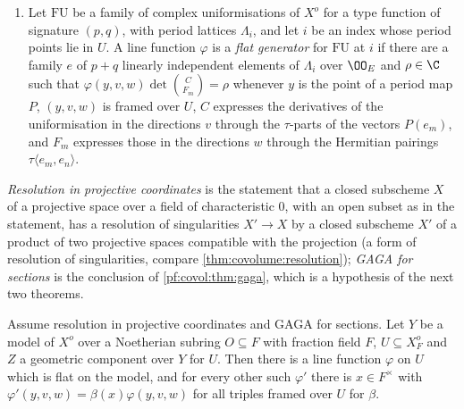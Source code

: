 \begin{definition}
\begin{enumerate}[label=(\alph*)]
{  $\kappa$} if $\log\|j(\varphi(y,v,w))\|=t$ for every discrete valuation ring $V'$ with fraction field $K'$,
  every embedding $j\colon K'\to\C_\ell$ with $V'=\{\|j(\cdot)\|\le1\}$ and $j\beta=\kappa$, and every triple
  framed over $U$ for $\beta$ at a point $y$ which extends to a semi-abelian scheme over $V'$ such that $v,w$
  are integral eigenframes of it.
\item Let $\mathrm{FU}$ be a family of complex uniformisations of $X^o$ for a type function of signature
  $(p,q)$, with period lattices $\Lambda_i$, and let $i$ be an index whose period points lie in $U$. A line
  function $\varphi$ is a \emph{flat generator} for $\mathrm{FU}$ at $i$ if there are a family $e$ of $p+q$
  linearly independent elements of $\Lambda_i$ over $\OO_E$ and $\rho\in\C$ such that
  $\varphi(y,v,w)\det\binom{C}{F_m}=\rho$ whenever $y$ is the point of a period map $P$, $(y,v,w)$ is framed
  over $U$, $C$ expresses the derivatives of the uniformisation in the directions $v$ through the
  $\tau$-parts of the vectors $P(e_m)$, and $F_m$ expresses those in the directions $w$ through the Hermitian
  pairings $\tau\langle e_m,e_n\rangle$.
\end{enumerate}
%
%
%
\end{definition}

\emph{Resolution in projective coordinates} is the statement that a closed subscheme $X$ of a projective space
over a field of characteristic $0$, with an open subset as in the statement, has a resolution of
singularities $X'\to X$ by a closed subscheme $X'$ of a product of two projective spaces compatible with the
projection (a form of resolution of singularities, compare \cref{thm:covolume:resolution});
\emph{GAGA for sections} is the conclusion of \cref{pf:covol:thm:gaga}, which is a hypothesis of the next
two theorems.

\begin{theorem}\label{pf:covol:thm:flatzero}
Assume resolution in projective coordinates and GAGA for sections. Let $Y$ be a model of $X^o$ over a
Noetherian subring $O\subseteq F$ with fraction field $F$, $U\subseteq X^o_F$ and $Z$ a geometric component
over $Y$ for $U$. Then there is a line function $\varphi$ on $U$ which is flat on the model, and for every
other such $\varphi'$ there is $x\in F^\times$ with $\varphi'(y,v,w)=\beta(x)\varphi(y,v,w)$ for all triples
framed over $U$ for $\beta$.
\end{theorem}

